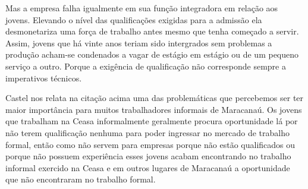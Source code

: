 \begin{citacao}
Mas a empresa falha igualmente em sua função integradora em relação aos jovens. 
Elevando o nível das qualificações exigidas para a admissão ela desmonetariza 
uma força de trabalho antes mesmo que tenha começado a servir. Assim, jovens que 
há vinte anos teriam sido intergrados sem problemas a produção acham-se 
condenados a vagar de estágio em estágio ou de um pequeno serviço a outro. 
Porque a exigência de qualificação não corresponde sempre a imperativos 
técnicos. \cite{castel1998metamorfoses}
\end{citacao}

Castel nos relata na citação acima uma das problemáticas que percebemos ser ter 
maior importância para muitos trabalhadores informais de Maracanaú. Os jovens 
que trabalham na Ceasa informalmente geralmente procura oportunidade lá por não 
terem qualificação nenhuma para poder ingressar no mercado de trabalho formal, 
então como não servem para empresas porque não estão qualificados ou porque não 
possuem experiência esses jovens acabam encontrando no trabalho informal 
exercido na Ceasa e em outros lugares de Maracanaú a oportunidade que não 
encontraram no trabalho formal.